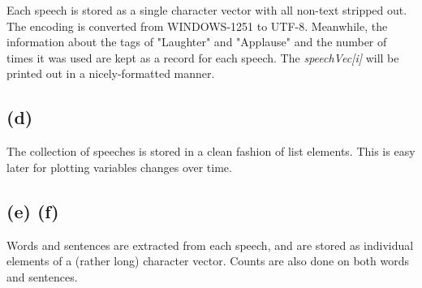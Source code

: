 \documentclass{article}
\begin{document}
Each speech is stored as a single character vector with all non-text stripped out. The encoding is converted from
WINDOWS-1251 to UTF-8.
Meanwhile, the information about the tags of "Laughter" and "Applause" and the number of times it was used
are kept as a record for each speech. The \textit{speechVec[i]} will be printed out in a nicely-formatted manner. 



\subsection*{(d)}

The collection of speeches is stored in a clean fashion of list elements. This is easy later for plotting
variables changes over time.



\subsection*{(e) (f)}

Words and sentences are extracted from each speech, and are stored as individual elements of a (rather long)
character vector. Counts are also done on both words and sentences.
\end{document}
